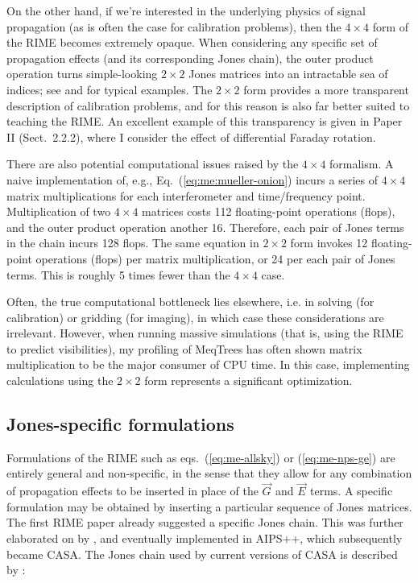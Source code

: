 \documentclass[referee]{aa}
\newcommand{\jones}[2]{\vec {#1}_{#2}}
\begin{document}
On the other hand, if we're interested in the underlying physics of signal propagation (as is often the case for calibration problems), then the $4\times4$ form of the RIME becomes extremely opaque. When considering any specific set of propagation effects (and its corresponding Jones chain), the outer product operation turns simple-looking $2\times2$ Jones matrices into an intractable sea of indices; see \citet[Eq. 4]{SB:imageplane} and \citet[Appendix A]{ME1} for typical examples. The $2\times2$ form provides a more transparent description of calibration problems, and for this reason is also far better suited to teaching the RIME. An excellent example of this transparency is given in Paper II (Sect.~2.2.2), where I consider the effect of differential Faraday rotation.

There are also potential computational issues raised by the $4\times4$ formalism. A naive implementation of, e.g., Eq.~(\ref{eq:me:mueller-onion}) incurs a series of $4\times4$ matrix multiplications for each interferometer and time/frequency point. Multiplication of two $4\times4$ matrices costs 112 floating-point operations (flops), and the outer product operation another 16. Therefore, each pair of Jones terms in the chain incurs 128 flops. The same equation in $2\times2$ form invokes 12 floating-point operations (flops) per matrix multiplication, or 24 per each pair of Jones terms. This is roughly 5 times fewer than the $4\times4$ case. 

Often, the true computational bottleneck lies elsewhere, i.e. in solving (for calibration) or gridding (for imaging), in which case these considerations are irrelevant. However, when running massive simulations (that is, using the RIME to predict visibilities), my profiling of MeqTrees has often shown matrix multiplication to be the major consumer of CPU time. In this case, implementing calculations using the $2\times2$ form represents a significant optimization.

\subsection{Jones-specific formulations\label{sec:jones-specific}} 

Formulations of the RIME such as eqs.~(\ref{eq:me-allsky}) or (\ref{eq:me-nps-ge}) are entirely general and non-specific, in the sense that they allow for any combination of propagation effects to be inserted in place of the $\jones{G}{}$ and $\jones{E}{}$ terms. A specific formulation may be obtained by inserting a particular sequence of Jones matrices. The first RIME paper \citep{ME1} already suggested a specific Jones chain. This was further elaborated on by \citet{JEN:note185}, and eventually implemented in AIPS++, which subsequently became CASA. The Jones chain used by current versions of CASA is described by \citet[Appendix E.1]{CASA:UserRef}:
\end{document}
